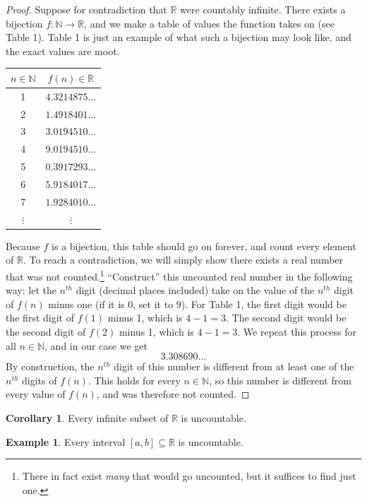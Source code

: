 \documentclass{article}
\newcommand{\N}{\mathbb{N}}
\newcommand{\R}{\mathbb{R}}
\theoremstyle{definition}
\newtheorem{corollary}{Corollary}[section]
\newtheorem{example}{Example}[section]
\begin{document}
\begin{proof}
Suppose for contradiction that $ \R $ were countably infinite. There exists a bijection $ f:\N\to\R $, and we make a table of values the function takes on (see Table 1). Table 1 is just an example of what such a bijection may look like, and the exact values are moot.
\begin{table}[h!]
	\centering
	\begin{tabular}{cc}
		$ n\in\N  $       & $ f(n)\in\R $              \\ \hline
		1        & $4.3214875\ldots$ \\
		2        & $1.4918401\ldots$           \\
		3        & $3.0194510\ldots$                   \\
		4        & $9.0194510\ldots$                  \\
		5        & $0.3917293\ldots $               \\
		6        & $ 5.9184017\ldots $\\
		7        & $ 1.9284010\ldots $                \\
		$\vdots$ & $\vdots$         
	\end{tabular}
\end{table}
Because $ f $ is a bijection, this table should go on forever, and count every element of $ \R $. To reach a contradiction, we will simply show there exists a real number that was not counted.\footnote{There in fact exist \textit{many} that would go uncounted, but it suffices to find just one.} ``Construct'' this uncounted real number in the following way: let the $ n^{th} $ digit (decimal places included) take on the value of the $ n^{th}$ digit of $ f(n) $ minus one (if it is $ 0 $, set it to $ 9 $). For Table 1, the first digit would be the first digit of $ f(1) $ minus 1, which is $ 4-1=3 $. The second digit would be the second digit of $ f(2) $ minus 1, which is $4-1=3$. We repeat this process for all $ n\in\N $, and in our case we get $$3.308690\ldots $$
By construction, the $ n^{th} $ digit of this number is different from at least one of the $ n^{th} $ digits of $ f(n) $. This holds for every $ n\in\N $, so this number is different from every value of $ f(n) $, and was therefore not counted.  
\end{proof}
\begin{corollary}
	Every infinite subset of $ \R $ is uncountable.
\end{corollary}
\begin{example}
	Every interval $ [a,b]\subseteq\R $ is uncountable. 
\end{example}
\end{document}
